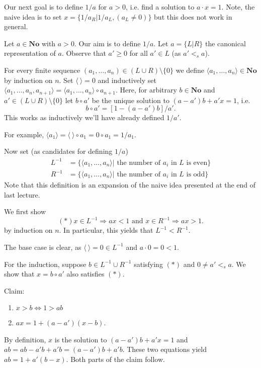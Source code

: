 Our next goal is to define $1/a$ for $a>0$, i.e. find a solution to $a\cdot x = 1$.
Note, the naive idea is to set $x = \{1/a_R | 1/a_L, (a_L\neq 0)\}$ but this does not work in general.


\begin{definition} %

Let $a\in \mathbf{No}$ with $a>0$. Our aim is to define $1/a$. Let $a = \{L|R\}$ the canonical representation of $a$. Observe that $a'\geq 0$ for all $a'\in L$ (as $a' <_s a$).

For every finite sequence $(a_1,\ldots,a_n)\in (L\cup R)\setminus \{0\}$ we define $\langle a_1,\ldots, a_n\rangle \in \mathbf{No}$ by induction on $n$. Set $\langle \ \rangle = 0$ and inductively set $\langle a_1,\ldots, a_n, a_{n+1}\rangle = \langle a_1,\ldots, a_n \rangle \circ a_{n+1}$.
Here, for arbitrary $b\in \mathbf{No}$ and $a'\in (L\cup R)\setminus \{0\}$ let $b\circ a'$ be the unique solution to $(a-a')b + a'x = 1$, i.e.
\[
b\circ a' = [1-(a-a')b]/a'.
\]
This works as inductively we'll have already defined $1/a'$.
 \end{definition}

For example, $\langle a_1 \rangle = \langle \ \rangle \circ a_1 = 0 \circ a_1 = 1/a_1$.

Now set (as candidates for defining $1/a$)
\begin{align*}
L^{-1} &= \{ \langle a_1,\ldots, a_n \rangle | \text{ the number of } a_i \text{ in }L \text{ is even} \} \\
R^{-1} &= \{ \langle a_1,\ldots, a_n \rangle | \text{ the number of } a_i \text{ in }L \text{ is odd} \}
\end{align*}
Note that this definition is an expansion of the naive idea presented at the end of last lecture.

We first show
\[
(*) x \in L^{-1} \Rightarrow ax < 1 \text{ and } x\in R^{-1} \Rightarrow ax > 1.
\]
by induction on $n$. In particular, this yields that $L^{-1} < R^{-1}$.

The base case is clear, as $\langle \ \rangle = 0\in L^{-1}$ and $a\cdot 0 = 0 < 1$.

For the induction, suppose $b\in L^{-1}\cup R^{-1}$ satisfying $(*)$ and $0\neq a' <_s a$. We show that $x = b\circ a'$ also satisfies $(*)$.

Claim:
\begin{enumerate}
\item $x > b \Leftrightarrow 1 > ab$
\item $ax = 1 + (a-a')(x-b)$.
\end{enumerate}
By definition, $x$ is the solution to $(a-a')b + a'x = 1$ and $ab = ab - a'b + a'b = (a-a')b + a'b$. These two equations yield $ab = 1 + a'(b-x)$. Both parts of the claim follow.


